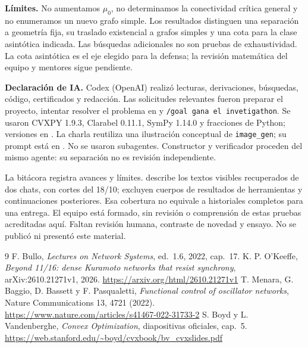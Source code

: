 \documentclass[10pt,a4paper]{article}
\newcommand{\muo}{\mu_0}
\begin{document}
\textbf{Límites.} No aumentamos $\muo$, no determinamos la conectividad crítica general y no enumeramos un nuevo grafo simple. Los resultados distinguen una separación a geometría fija, su traslado existencial a grafos simples y una cota para la clase asintótica indicada. Las búsquedas adicionales no son pruebas de exhaustividad. La cota asintótica es el eje elegido para la defensa; la revisión matemática del equipo y mentores sigue pendiente.

\textbf{Declaración de IA.}
Codex (OpenAI) realizó lecturas, derivaciones, búsquedas, código, certificados y redacción. Las solicitudes relevantes fueron preparar el proyecto, intentar resolver el problema en  y \texttt{/goal gana el invetigathon}. Se usaron CVXPY 1.9.3, Clarabel 0.11.1, SymPy 1.14.0 y fracciones de Python; versiones en . La charla reutiliza una ilustración conceptual de \texttt{image\_gen}; su prompt está en . No se usaron subagentes. Constructor y verificador proceden del mismo agente: su separación no es revisión independiente.

La bitácora registra avances y límites.  describe los textos visibles recuperados de dos chats, con cortes del 18/10; excluyen cuerpos de resultados de herramientas y continuaciones posteriores. Esa cobertura no equivale a historiales completos para una entrega. El equipo está formado, sin revisión o comprensión de estas pruebas acreditadas aquí. Faltan revisión humana, contraste de novedad y ensayo. No se publicó ni presentó este material.

\begin{thebibliography}{9}
 F. Bullo, \emph{Lectures on Network Systems}, ed.\ 1.6, 2022, cap.\ 17.
 K. P. O'Keeffe, \emph{Beyond 11/16: dense Kuramoto networks that resist synchrony}, arXiv:2610.21271v1, 2026. \url{https://arxiv.org/html/2610.21271v1}
 T. Menara, G. Baggio, D. Bassett y F. Pasqualetti, \emph{Functional control of oscillator networks}, Nature Communications 13, 4721 (2022). \url{https://www.nature.com/articles/s41467-022-31733-2}
 S. Boyd y L. Vandenberghe, \emph{Convex Optimization}, diapositivas oficiales, cap.\ 5. \url{https://web.stanford.edu/~boyd/cvxbook/bv_cvxslides.pdf}
\end{thebibliography}
\end{document}
